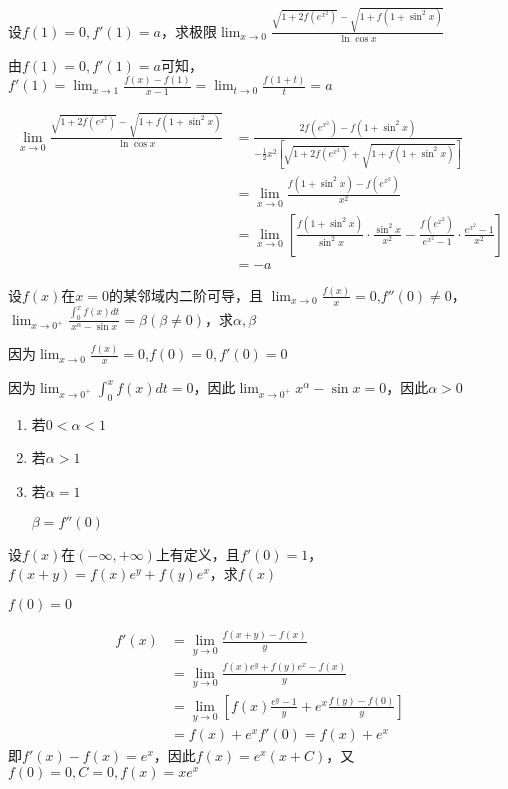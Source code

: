 \documentclass{article}
\begin{document}
\begin{examplle}[]
设\(f(1)=0,f'(1)=a\)，求极限\(\displaystyle
  \lim_{x\to0}\frac{\sqrt{1+2f(e^{x^2})}- \sqrt{1+f(1+\sin^2 x)}}{\ln\cos x}\)

由\(f(1)=0,f'(1)=a\)可知，\(\displaystyle
  f'(1)=\lim_{x\to1}\frac{f(x)-f(1)}{x-1}=\lim_{t\to0}\frac{f(1+t)}{t}=a\)

\begin{align*}
\lim_{x\to0}\frac{\sqrt{1+2f(e^{x^2})}- \sqrt{1+f(1+\sin^2 x)}}{\ln\cos x}&=
\frac{2f(e^{x^2})-f(1+\sin^2x)}{-\frac{1}{2}x^2
\left[\sqrt{1+2f(e^{x^2})}+\sqrt{1+f(1+\sin^2x)}
\right]}\\
&=\lim_{x\to0}\frac{f(1+\sin^2x)-f(e^{x^2})}{x^2}\\
&=\lim_{x\to0}\left[
\frac{f(1+\sin^2x)}{\sin^2x}\cdot\frac{\sin^2x}{x^2}-
\frac{f(e^{x^2})}{e^{x^2}-1}\cdot\frac{e^{x^2}-1}{x^2}
\right]\\
&=-a
\end{align*}
\end{examplle}

\begin{examplle}[]
设\(f(x)\)在\(x=0\)的某邻域内二阶可导，且
\(\displaystyle\lim_{x\to0}\frac{f(x)}{x}=0\),\(f''(0)\neq0\)，
\(\displaystyle\lim_{x\to0^+}\frac{\int_0^xf(x)dt}{x^\alpha-\sin
  x}=\beta(\beta\neq0)\)，求\(\alpha,\beta\)

因为\(\lim_{x\to0}\frac{f(x)}{x}=0\),\(f(0)=0,f'(0)=0\)

因为\(\lim_{x\to0^+}\int_0^xf(x)dt=0\)，因此\(\lim_{x\to0^+}x^\alpha-\sin
  x=0\)，因此\(\alpha>0\)
\begin{enumerate}
\item 若\(0<\alpha<1\)
\item 若\(\alpha>1\)
\item 若\(\alpha=1\)

\(\beta=f''(0)\)
\end{enumerate}
\end{examplle}

\begin{examplle}[]
设\(f(x)\)在\((-\infty,+\infty)\)上有定义，且\(f'(0)=1\)，
\(f(x+y)=f(x)e^y+f(y)e^x\)，求\(f(x)\)

\(f(0)=0\)

\begin{align*}
f'(x)&=\lim_{y\to0}\frac{f(x+y)-f(x)}{y}\\
&=\lim_{y\to0}\frac{f(x)e^y+f(y)e^x-f(x)}{y}\\
&=\lim_{y\to0}\left[
f(x)\frac{e^y-1}{y}+e^x\frac{f(y)-f(0)}{y}
\right]\\
&=f(x)+e^xf'(0)=f(x)+e^x
\end{align*}
即\(f'(x)-f(x)=e^x\)，因此\(f(x)=e^x(x+C)\)，又\(f(0)=0,C=0,f(x)=xe^x\)
\end{examplle}
\end{document}
